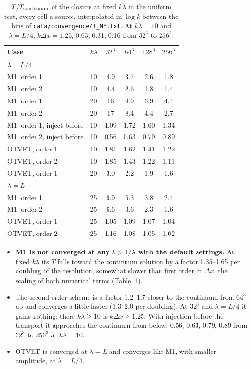 \documentclass[11pt]{article}
\newcommand{\dx}{\Delta x}
\begin{document}
\begin{table}
\centering
\caption{$T/T_{\rm continuum}$ of the closure at fixed $k\lambda$ in the uniform test, every cell a source,
interpolated in $\log k$ between the bins of \texttt{data/convergence/T\_N*.txt}. At $k\lambda=10$ and
$\lambda=L/4$, $k\dx=1.25$, 0.63, 0.31, 0.16 from $32^3$ to $256^3$.}
\label{tab:uniconv}
\begin{tabular}{llcccc}
\toprule
Case & $k\lambda$ & $32^3$ & $64^3$ & $128^3$ & $256^3$\\
\midrule
\multicolumn{6}{l}{$\lambda=L/4$}\\
M1, order 1 & 10 & 4.9 & 3.7 & 2.6 & 1.8\\
M1, order 2 & 10 & 4.4 & 2.6 & 1.8 & 1.4\\
M1, order 1 & 20 & 16 & 9.9 & 6.9 & 4.4\\
M1, order 2 & 20 & 17 & 8.4 & 4.4 & 2.7\\
M1, order 1, inject before & 10 & 1.09 & 1.72 & 1.60 & 1.34\\
M1, order 2, inject before & 10 & 0.56 & 0.63 & 0.79 & 0.89\\
OTVET, order 1 & 10 & 1.81 & 1.62 & 1.41 & 1.22\\
OTVET, order 2 & 10 & 1.85 & 1.43 & 1.22 & 1.11\\
OTVET, order 1 & 20 & 3.0 & 2.2 & 1.9 & 1.6\\
\midrule
\multicolumn{6}{l}{$\lambda=L$}\\
M1, order 1 & 25 & 9.9 & 6.3 & 3.8 & 2.4\\
M1, order 2 & 25 & 6.6 & 3.6 & 2.3 & 1.6\\
OTVET, order 1 & 25 & 1.05 & 1.09 & 1.07 & 1.04\\
OTVET, order 2 & 25 & 1.16 & 1.08 & 1.05 & 1.02\\
\bottomrule
\end{tabular}
\end{table}

\begin{itemize}
\item \textbf{M1 is not converged at any $k>1/\lambda$ with the default settings.} At fixed $k\lambda$ its $T$ falls
toward the continuum solution by a factor 1.35--1.65 per doubling of the resolution, somewhat slower than first order in
$\dx$, the scaling of both numerical terms (Table~\ref{tab:uniconv}).
\item The second-order scheme is a factor 1.2--1.7 closer to the continuum from $64^3$ up and converges
a little faster (1.3--2.0 per doubling). At $32^3$ and $\lambda=L/4$ it gains nothing: there $k\lambda\ge10$ is
$k\dx\ge1.25$. With injection before the
transport it approaches the continuum from below, 0.56, 0.63, 0.79, 0.89 from $32^3$ to $256^3$ at $k\lambda=10$.
\item OTVET is converged at $\lambda=L$ and converges like M1, with smaller amplitude, at $\lambda=L/4$.
\end{itemize}
\end{document}
